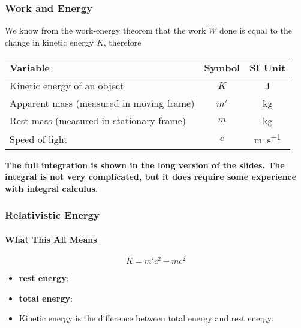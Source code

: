 \documentclass[12pt,compress,aspectratio=169]{beamer}
\newcommand{\eq}[2]{\vspace{#1}{\Large\begin{displaymath}#2\end{displaymath}}}
\begin{document}
\begin{frame}
  \frametitle{Work and Energy}

  We know from the work-energy theorem that the work $W$ done is equal to the
  change in kinetic energy $K$, therefore
 
  \eq{-.2in}{ \boxed{K=m'c^2-mc^2} }

  \vspace{-.1in}
  \begin{center}
    \begin{tabular}{l|c|c}
      \rowcolor{pink}
      \textbf{Variable} & \textbf{Symbol} & \textbf{SI Unit}\\ \hline
      Kinetic energy of an object & $K$  & \si{\joule}\\
      Apparent mass (measured in moving frame) & $m'$ & \si{\kilo\gram}\\
      Rest mass (measured in stationary frame) & $m$  & \si{\kilo\gram}\\
      Speed of light              & $c$ & \si{\metre\per\second}
    \end{tabular}
  \end{center}

  \textbf{The full integration is shown in the long version of the slides. The
    integral is not very complicated, but it does require some experience with
    integral calculus.}
\end{frame}

\begin{frame}
  \frametitle{Relativistic Energy}
  \framesubtitle{What This All Means}
  {\Large
    \begin{displaymath}
      \boxed{K=m'c^2-mc^2}
    \end{displaymath}
  }

  \begin{itemize}
  \item\vspace{-.3in}\textbf{rest energy}:
  
    \eq{-.4in}{ E_0=mc^2 }
  \item\textbf{total energy}:
    
    \eq{-.3in}{
      E_T=m'c^2=\gamma mc^2
    }
  \item Kinetic energy is the difference between total energy and rest energy:

    \eq{-.3in}{
      K=E_T-E_0
    }
  \end{itemize}
\end{frame}
\end{document}
